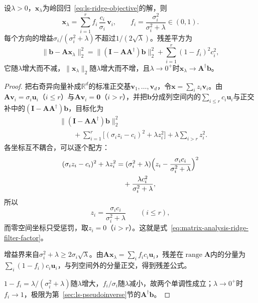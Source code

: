 \begin{theorem}[岭回归的滤波因子]
\label{thm:ls-ridge-filter-factors}
设$\lambda>0$，$\bm x_\lambda$为岭回归~\eqref{eq:ls-ridge-objective}的解，则
\begin{equation}
 \bm x_\lambda=\sum_{i=1}^r f_i\,\frac{c_i}{\sigma_i}\,\bm v_i,\qquad
 f_i=\frac{\sigma_i^2}{\sigma_i^2+\lambda}\in(0,1).
 \label{eq:matrix-analysis-ridge-filter-factor}
\end{equation}
每个方向的增益$\sigma_i/(\sigma_i^2+\lambda)$不超过$1/(2\sqrt\lambda)$。残差平方为
\begin{equation}
 \lVert\bm b-\bm A\bm x_\lambda\rVert_2^2=\lVert(\bm I-\bm A\bm A^\dagger)\bm b\rVert_2^2+\sum_{i=1}^r(1-f_i)^2c_i^2,
 \label{eq:ls-ridge-residual}
\end{equation}
它随$\lambda$增大而不减，$\lVert\bm x_\lambda\rVert_2$随$\lambda$增大而不增，且$\lambda\to0^+$时$\bm x_\lambda\to\bm A^\dagger\bm b$。
\end{theorem}
\begin{proof}
把右奇异向量补成$\mathbb R^d$的标准正交基$\bm v_1,\ldots,\bm v_d$，令$\bm x=\sum_iz_i\bm v_i$。由$\bm A\bm v_i=\sigma_i\bm u_i$（$i\leq r$）与$\bm A\bm v_i=\bm0$（$i>r$），并把$\bm b$分成列空间内的$\sum_{i\leq r}c_i\bm u_i$与正交补中的$(\bm I-\bm A\bm A^\dagger)\bm b$，目标化为
\[
 \begin{aligned}
 &\lVert(\bm I-\bm A\bm A^\dagger)\bm b\rVert_2^2\\
 &\qquad+\sum_{i=1}^r\bigl[(\sigma_iz_i-c_i)^2+\lambda z_i^2\bigr]+\lambda\sum_{i>r}z_i^2 .
 \end{aligned}
\]
各坐标互不耦合，可以逐个配方：
\[
 \begin{aligned}
 (\sigma_iz_i-c_i)^2+\lambda z_i^2
 &=(\sigma_i^2+\lambda)\Bigl(z_i-\frac{\sigma_ic_i}{\sigma_i^2+\lambda}\Bigr)^2\\
 &\quad+\frac{\lambda c_i^2}{\sigma_i^2+\lambda},
 \end{aligned}
\]
所以
\[
 z_i=\frac{\sigma_ic_i}{\sigma_i^2+\lambda}\qquad(i\leq r),
\]
而零空间坐标只受惩罚，取$z_i=0$（$i>r$）。这就是式~\eqref{eq:matrix-analysis-ridge-filter-factor}。

增益界来自$\sigma_i^2+\lambda\geq2\sigma_i\sqrt\lambda$。由$\bm A\bm x_\lambda=\sum_if_ic_i\bm u_i$，残差在$\operatorname{range}\bm A$内的分量为$\sum_i(1-f_i)c_i\bm u_i$，与列空间外的分量正交，得到残差公式。

$1-f_i=\lambda/(\sigma_i^2+\lambda)$随$\lambda$增大，$f_i/\sigma_i$随$\lambda$减小，故两个单调性成立；$\lambda\to0^+$时$f_i\to1$，极限为第~\ref{sec:ls-pseudoinverse}节的$\bm A^\dagger\bm b$。
\end{proof}


